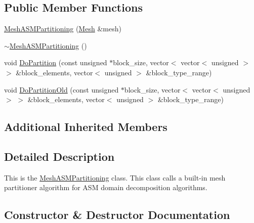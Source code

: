 \subsection*{Public Member Functions}
\begin{DoxyCompactItemize}
\item 
\mbox{\hyperlink{classfemus_1_1_mesh_a_s_m_partitioning_a93a9188a30668cfe3d73ef80e8b93d4e}{Mesh\+A\+S\+M\+Partitioning}} (\mbox{\hyperlink{classfemus_1_1_mesh}{Mesh}} \&mesh)
\item 
\mbox{\hyperlink{classfemus_1_1_mesh_a_s_m_partitioning_a9f0a9032ae1dde1a98b579a26dd9c3c4}{$\sim$\+Mesh\+A\+S\+M\+Partitioning}} ()
\item 
void \mbox{\hyperlink{classfemus_1_1_mesh_a_s_m_partitioning_ae322bd9c4e4308a647bb228c504db128}{Do\+Partition}} (const unsigned $\ast$block\+\_\+size, vector$<$ vector$<$ unsigned $>$ $>$ \&block\+\_\+elements, vector$<$ unsigned $>$ \&block\+\_\+type\+\_\+range)
\item 
void \mbox{\hyperlink{classfemus_1_1_mesh_a_s_m_partitioning_a7634351749a07b26f70877a1e4388173}{Do\+Partition\+Old}} (const unsigned $\ast$block\+\_\+size, vector$<$ vector$<$ unsigned $>$ $>$ \&block\+\_\+elements, vector$<$ unsigned $>$ \&block\+\_\+type\+\_\+range)
\end{DoxyCompactItemize}
\subsection*{Additional Inherited Members}


\subsection{Detailed Description}
This is the {\ttfamily \mbox{\hyperlink{classfemus_1_1_mesh_a_s_m_partitioning}{Mesh\+A\+S\+M\+Partitioning}}} class. This class calls a built-\/in mesh partitioner algorithm for A\+SM domain decomposition algorithms. 

\subsection{Constructor \& Destructor Documentation}
\mbox{\label{classfemus_1_1_mesh_a_s_m_partitioning_a93a9188a30668cfe3d73ef80e8b93d4e}} 
